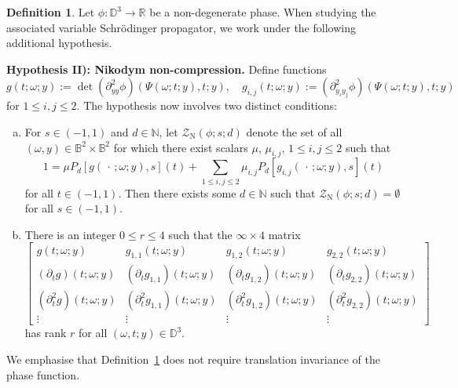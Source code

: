 \documentclass[reqno]{amsart}
\numberwithin{equation}{section}
\newcommand{\B}{\mathbb{B}}
\newcommand{\D}{\mathbb{D}}
\newcommand{\N}{\mathbb{N}}
\newcommand{\R}{\mathbb{R}}
\newcommand{\cZ}{\mathcal{Z}}
\theoremstyle{plain}
\theoremstyle{definition}
\newtheorem{definition}[theorem]{Definition}
\begin{document}
\begin{definition}\label{dfn: n=3 lin comb N} Let $\phi \colon \D^3 \to \R$ be a non-degenerate phase. When studying the associated variable Schr\"odinger propagator, we work under the following additional hypothesis.\medskip
    

\noindent \textbf{Hypothesis II): Nikodym non-compression.} Define functions
\begin{equation*}
    g(t; \omega; y) := \det (\partial_{yy}^2\phi)(\Psi(\omega; t; y),t;y), \quad  g_{i, j}(t; \omega; y) := (\partial_{y_iy_j}^2 \phi)(\Psi(\omega; t; y),t;y)
\end{equation*}
for $1 \leq i, j \leq 2$. The hypothesis now involves two distinct conditions:
\begin{enumerate}[a)]
    \item For $s \in (-1,1)$ and $d \in \N$, let $\cZ_{\mathrm{N}}(\phi;s;d)$ denote the set of all $(\omega, y) \in \B^2 \times \B^2$ for which there exist scalars $\mu$, $\mu_{i,j}$, $1 \leq i, j \leq 2$ such that
   \begin{equation*}
    1 = \mu P_d[g(\,\cdot\,; \omega; y), s](t)+ \sum_{1 \leq i, j \leq 2} \mu_{i,j} P_d[g_{i,j}(\,\cdot\,; \omega; y), s](t)
\end{equation*} 
for all $t \in (-1,1)$. Then there exists some $d \in \N$ such that $\cZ_{\mathrm{N}}(\phi; s; d) = \emptyset$ for all $s \in (-1,1)$.
\item There is an integer $0 \leq r \leq 4$ such that the $\infty \times 4$ matrix
\begin{equation*}
 \begin{bmatrix}
         g (t; \omega ;y) & g_{1,1} (t; \omega ;y) & g_{1,2} (t; \omega ;y) &  g_{2,2} (t; \omega ;y) \\
        (\partial_t g) (t; \omega ;y) & (\partial_t g_{1,1}) (t; \omega ;y) & (\partial_t g_{1,2}) (t; \omega ;y) & (\partial_t  g_{2,2}) (t; \omega ;y) \\
        (\partial_t^2 g) (t; \omega ;y) & (\partial_t^2 g_{1,1}) (t; \omega ;y) & (\partial_t^2 g_{1,2}) (t; \omega ;y) & (\partial_t^2  g_{2,2}) (t; \omega ;y) \\
        \vdots & \vdots & \vdots & \vdots
    \end{bmatrix}
\end{equation*}
has rank $r$ for all $(\omega, t;y) \in \D^3$. 
\end{enumerate}
\end{definition}
We emphasise that Definition~\ref{dfn: n=3 lin comb N} does not require translation invariance of the phase function. 
\end{document}
